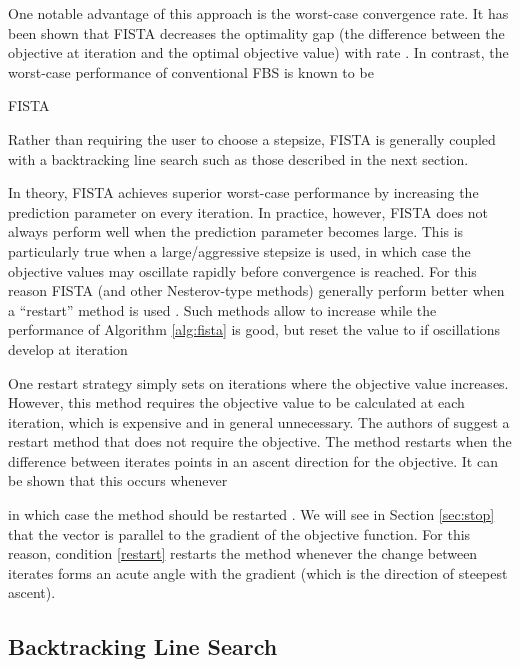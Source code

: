 \documentclass{amsart}
\newcommand{\eqn}[2]{}
\newcommand{\ra}{\rangle}
\newcommand{\la}{\langle}
\theoremstyle{definition}
\begin{document}
 One notable advantage of this approach is the worst-case convergence rate.  It has been shown that FISTA decreases the optimality gap (the difference between the objective at iteration  and the optimal objective value)  with rate  \cite{BT09}.  In contrast, the worst-case performance of conventional FBS is known to be 
\begin{algorithm}[H]
\caption{FISTA}
\label{alg:fista}
\begin{algorithmic}[1]
\Require 
\For {}
\State 
\State 
\State \label{predict}
\EndFor 
\end{algorithmic}
\end{algorithm}
\noindent Rather than requiring the user to choose a stepsize, FISTA is generally coupled with a backtracking line search such as those described in the next section.

In theory, FISTA achieves superior worst-case performance by increasing the prediction parameter  on every iteration. In practice, however, FISTA does not always perform well when the prediction parameter  becomes large.  This is particularly true when a large/aggressive stepsize is used, in which case the objective values may oscillate rapidly before convergence is reached.  For this reason FISTA (and other Nesterov-type methods) generally perform better when a ``restart'' method is used  \cite{OC12}. Such methods allow  to increase while the performance of Algorithm \ref{alg:fista} is good, but reset the value to  if oscillations develop at iteration     
 
   One restart strategy simply sets  on iterations where the objective value increases.  However, this method requires the objective value to be calculated at each iteration, which is expensive and in general unnecessary.  The authors of \cite{OC12} suggest a restart method that does not require the objective.  The method restarts when the difference between iterates  points in an ascent direction for the objective. It can be shown that this occurs whenever
      \eqn{restart}{\la y^k-x^k , x^k-x^{k-1}\ra \ge 0}
in which case the method should be restarted \cite{OC12}.  We will see in Section \ref{sec:stop} that the vector  is parallel to the gradient of the objective function.  For this reason, condition \eqref{restart} restarts the method whenever the change between iterates forms an acute angle with the gradient (which is the direction of steepest ascent).

\subsection{Backtracking Line Search} \label{sec:linesearch}
\end{document}
